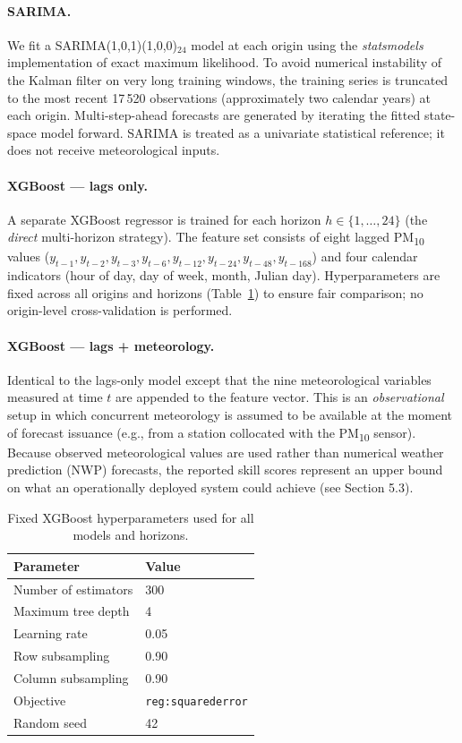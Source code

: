 \documentclass[12pt,a4paper]{article}
\newcommand{\PMten}{PM\textsubscript{10}}
\begin{document}
\paragraph{SARIMA.}
We fit a SARIMA(1,0,1)(1,0,0)$_{24}$ model at each origin using the
\textit{statsmodels} implementation of exact maximum likelihood.  To avoid
numerical instability of the Kalman filter on very long training windows, the
training series is truncated to the most recent 17\,520 observations
(approximately two calendar years) at each origin.  Multi-step-ahead forecasts
are generated by iterating the fitted state-space model forward.  SARIMA is
treated as a univariate statistical reference; it does not receive
meteorological inputs.

\paragraph{XGBoost — lags only.}
A separate XGBoost regressor \citep{Chen2016} is trained for each horizon
$h \in \{1, \ldots, 24\}$ (the \emph{direct} multi-horizon strategy).  The
feature set consists of eight lagged \PMten{} values
($y_{t-1}, y_{t-2}, y_{t-3}, y_{t-6}, y_{t-12}, y_{t-24}, y_{t-48},
y_{t-168}$) and four calendar indicators (hour of day, day of week, month,
Julian day).  Hyperparameters are fixed across all origins and horizons
(Table~\ref{tab:xgb_params}) to ensure fair comparison; no origin-level
cross-validation is performed.

\paragraph{XGBoost — lags + meteorology.}
Identical to the lags-only model except that the nine meteorological variables
measured at time $t$ are appended to the feature vector.  This is an
\emph{observational} setup in which concurrent meteorology is assumed to be
available at the moment of forecast issuance (e.g., from a station collocated
with the \PMten{} sensor).  Because observed meteorological values are used
rather than numerical weather prediction (NWP) forecasts, the reported skill
scores represent an upper bound on what an operationally deployed
system could achieve (see Section 5.3).

\begin{table}[htbp]
\centering
\caption{Fixed XGBoost hyperparameters used for all models and horizons.}
\label{tab:xgb_params}
\begin{tabular}{ll}
\toprule
Parameter & Value \\
\midrule
Number of estimators & 300 \\
Maximum tree depth & 4 \\
Learning rate & 0.05 \\
Row subsampling & 0.90 \\
Column subsampling & 0.90 \\
Objective & \texttt{reg:squarederror} \\
Random seed & 42 \\
\bottomrule
\end{tabular}
\end{table}
\end{document}
